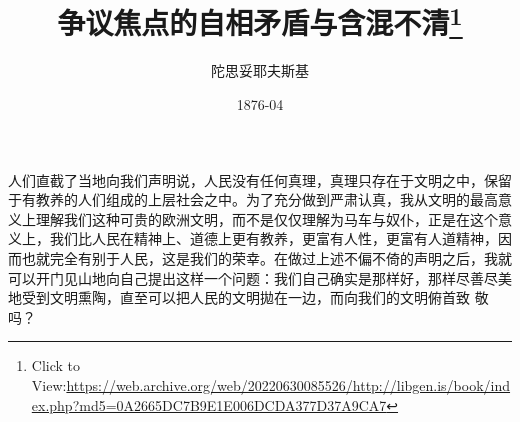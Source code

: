 \documentclass{article}
\title{争议焦点的自相矛盾与含混不清\footnote{Click to View:\url{https://web.archive.org/web/20220630085526/http://libgen.is/book/index.php?md5=0A2665DC7B9E1E006DCDA377D37A9CA7}}}
\author{陀思妥耶夫斯基}
\date{1876-04}
\begin{document}

\maketitle


\Large

﻿人们直截了当地向我们声明说，人民没有任何真理，真理只存在于文明之中，保留于有教养的人们组成的上层社会之中。为了充分做到严肃认真，我从文明的最高意义上理解我们这种可贵的欧洲文明，而不是仅仅理解为马车与奴仆，正是在这个意义上，我们比人民在精神上、道德上更有教养，更富有人性，更富有人道精神，因而也就完全有别于人民，这是我们的荣幸。在做过上述不偏不倚的声明之后，我就可以开门见山地向自己提出这样一个问题：我们自己确实是那样好，那样尽善尽美地受到文明熏陶，直至可以把人民的文明拋在一边，而向我们的文明俯首致
敬吗？ 
\end{document}
